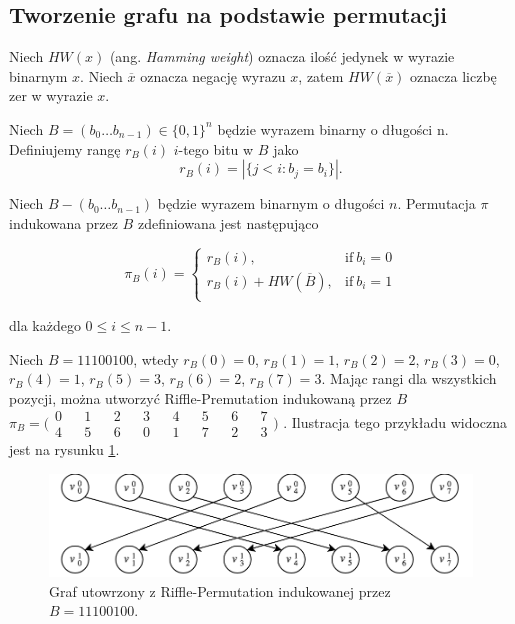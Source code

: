 \subsection{Tworzenie grafu na podstawie permutacji}

Niech $HW(x)$ (ang. \textit{Hamming weight}) oznacza ilość jedynek w wyrazie binarnym $x$. Niech $\overline{x}$ oznacza negację wyrazu $x$, zatem $HW(\overline{x})$ oznacza liczbę zer w wyrazie $x$.

\begin{definition}
	Niech $B = (b_{0} \dots b_{n-1}) \in \{ 0, 1 \}^{n}$ będzie wyrazem binarny o długości n. Definiujemy rangę $r_{B}(i)$ $i$-tego bitu w $B$ jako
	$$ r_{B}(i) = | \{ j < i : b_{j} = b_{i} \} | .$$
\end{definition}

\begin{definition} Niech $B - (b_{0} \dots b_{n - 1})$ będzie wyrazem binarnym o długości $n$. Permutacja $\pi$ indukowana przez $B$ zdefiniowana jest następująco

	$$
	\pi_{B}(i) =
	\begin{cases}
	r_{B}(i), & \text{if}\ b_{i} = 0 \\
	r_{B}(i) + HW(\overline{B}), & \text{if}\ b_{i} = 1 \\
	\end{cases}
	$$
	
	dla każdego $ 0 \leq i \leq n-1$.
	
\end{definition}

\begin{example} \label{2::p1}
	Niech $B = 11100100$, wtedy $r_{B}(0) = 0$, $r_{B}(1) = 1$, $r_{B}(2) = 2$,
	$r_{B}(3) = 0$, $r_{B}(4) = 1$, $r_{B}(5) = 3$, $r_{B}(6) = 2$, $r_{B}(7) = 3$.
	Mając rangi dla wszystkich pozycji, można utworzyć Riffle-Premutation indukowaną przez $B$ 
	$\pi_{B} = \bigl( \begin{smallmatrix}
	0 && 1 && 2 && 3 && 4 && 5 && 6 && 7 \\
	4 && 5 && 6 && 0 && 1 && 7 && 2 && 3
	\end{smallmatrix} \bigr) $ .
	Ilustracja tego przykładu widoczna jest na rysunku \ref{2::im1}.
\end{example}

\begin{figure}[h]
	\includegraphics[width=\textwidth]{rp1.png}
	\centering	
	\caption{Graf utowrzony z Riffle-Permutation indukowanej przez $B=11100100$.}
	\label{2::im1}
\end{figure}

